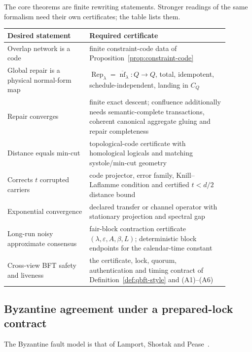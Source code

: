 The core theorems are finite rewriting statements. Stronger readings of
the same formalism need their own certificates; the table lists them.

\begin{center}
\small
\begin{tabular}{@{}p{0.33\linewidth}p{0.56\linewidth}@{}}
\textbf{Desired statement} & \textbf{Required certificate} \\
\hline
Overlap network is a code & finite constraint-code data of Proposition~\ref{prop:constraint-code} \\
Global repair is a physical normal-form map & \(\operatorname{Rep}_\lambda=\overline{\operatorname{nf}}_\lambda:Q\to Q\), total, idempotent, schedule-independent, landing in \(C_Q\) \\
Repair converges & finite exact descent; confluence additionally needs semantic-complete transactions, coherent canonical aggregate gluing and repair completeness \\
Distance equals min-cut & topological-code certificate with homological logicals and matching systole/min-cut geometry \\
Corrects \(t\) corrupted carriers & code projector, error family, Knill--Laflamme condition and certified \(t<d/2\) distance bound \\
Exponential convergence & declared transfer or channel operator with stationary projection and spectral gap \\
Long-run noisy approximate consensus & fair-block contraction certificate \((\lambda,\varepsilon,A,\beta,L)\); deterministic block endpoints for the calendar-time constant \\
Cross-view BFT safety and liveness & the certificate, lock, quorum, authentication and timing contract of Definition~\ref{def:qbft-style} and (A1)--(A6) \\
\end{tabular}
\end{center}

\subsection*{Byzantine agreement under a prepared-lock contract}

The Byzantine fault model is that of Lamport, Shostak and Pease~\cite{Lamport1982}.

